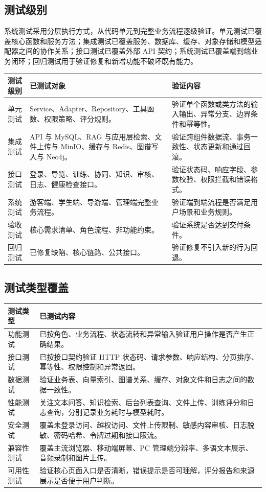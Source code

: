 \subsection{测试级别}

系统测试采用分层执行方式，从代码单元到完整业务流程逐级验证。单元测试已覆盖核心函数和服务方法；集成测试已覆盖服务、数据库、缓存、对象存储和模型适配器之间的协作关系；接口测试已覆盖外部 API 契约；系统测试已覆盖端到端业务闭环；回归测试用于验证修复和新增功能不破坏既有能力。

\begin{longtable}{p{2.5cm}p{5.0cm}p{5.7cm}}
\toprule
测试级别 & 已测试对象 & 验证内容 \\
\midrule
单元测试 & Service、Adapter、Repository、工具函数、权限策略、评分规则。 & 验证单个函数或类方法的输入输出、异常分支、边界条件和幂等性。 \\
集成测试 & API 与 MySQL、RAG 与应用层检索、文件上传与 MinIO、缓存与 Redis、图谱写入与 Neo4j。 & 验证跨组件数据流、事务一致性、状态更新和通过回滚。 \\
接口测试 & 登录、导览、训练、协同、知识、审核、日志、健康检查接口。 & 验证状态码、响应字段、参数校验、权限拦截和错误格式。 \\
系统测试 & 游客端、学生端、导游端、管理端完整业务流程。 & 验证端到端流程是否满足用户场景和业务规则。 \\
验收测试 & 核心需求清单、角色流程、非功能约束。 & 验证系统是否达到交付条件。 \\
回归测试 & 已修复缺陷、核心链路、公共接口。 & 验证修复不引入新的行为回退。 \\
\bottomrule
\end{longtable}

\subsection{测试类型覆盖}

\begin{longtable}{p{2.7cm}p{10.7cm}}
\toprule
测试类型 & 已测试内容 \\
\midrule
功能测试 & 已按角色、业务流程、状态流转和异常输入验证用户操作是否产生正确结果。 \\
接口测试 & 已按接口契约验证 HTTP 状态码、请求参数、响应结构、分页排序、幂等性、权限控制和异常返回。 \\
数据测试 & 验证业务表、向量索引、图谱关系、缓存、对象文件和日志之间的数据一致性。 \\
性能测试 & 关注文本问答、知识检索、后台列表查询、文件上传、训练评分和日志查询，分别记录业务耗时与模型耗时。 \\
安全测试 & 覆盖未登录访问、越权访问、文件上传限制、敏感内容审核、日志脱敏、密码哈希、令牌过期和接口限流。 \\
兼容性测试 & 覆盖主流浏览器、移动端屏幕、PC 管理端分辨率、多语文本展示、音频录制和图片上传。 \\
可用性测试 & 验证核心页面入口是否清晰，错误提示是否可理解，评分报告和来源展示是否便于用户判断。 \\
\bottomrule
\end{longtable}

